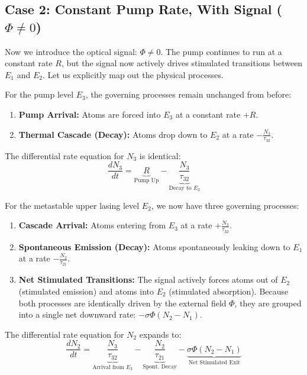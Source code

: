 \subsection{Case 2: Constant Pump Rate, With Signal (\texorpdfstring{$\Phi \neq 0$}{Phi not=0})}

Now we introduce the optical signal: $\Phi \neq 0$. The pump continues to run at a constant rate $R$, but the signal now actively drives stimulated transitions between $E_1$ and $E_2$. Let us explicitly map out the physical processes.

For the pump level $E_3$, the governing processes remain unchanged from before:
\begin{enumerate}
    \item \textbf{Pump Arrival:} Atoms are forced into $E_3$ at a constant rate $+R$.
    \item \textbf{Thermal Cascade (Decay):} Atoms drop down to $E_2$ at a rate $-\frac{N_3}{\tau_{32}}$.
\end{enumerate}

The differential rate equation for $N_3$ is identical:
\begin{equation}
    \frac{dN_3}{dt} = \underbrace{R}_{\text{Pump Up}} - \underbrace{\frac{N_3}{\tau_{32}}}_{\text{Decay to } E_2} \tag{I}
\end{equation}

For the metastable upper lasing level $E_2$, we now have three governing processes:
\begin{enumerate}
    \item \textbf{Cascade Arrival:} Atoms entering from $E_3$ at a rate $+\frac{N_3}{\tau_{32}}$.
    \item \textbf{Spontaneous Emission (Decay):} Atoms spontaneously leaking down to $E_1$ at a rate $-\frac{N_2}{\tau_{21}}$.
    \item \textbf{Net Stimulated Transitions:} The signal actively forces atoms out of $E_2$ (stimulated emission) and atoms into $E_2$ (stimulated absorption). Because both processes are identically driven by the external field $\Phi$, they are grouped into a single net downward rate: $-\sigma\Phi(N_2 - N_1)$.
\end{enumerate}

The differential rate equation for $N_2$ expands to:
\begin{equation}
    \frac{dN_2}{dt} = \underbrace{\frac{N_3}{\tau_{32}}}_{\text{Arrival from } E_3} - \underbrace{\frac{N_2}{\tau_{21}}}_{\text{Spont. Decay}} - \underbrace{\sigma\Phi(N_2 - N_1)}_{\text{Net Stimulated Exit}} \tag{II}
\end{equation}

